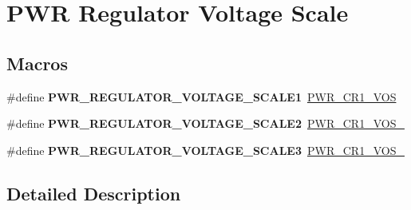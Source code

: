 \hypertarget{group___p_w_r___regulator___voltage___scale}{}\section{P\+WR Regulator Voltage Scale}
\label{group___p_w_r___regulator___voltage___scale}
\subsection*{Macros}
\begin{DoxyCompactItemize}
\item 
\mbox{\label{group___p_w_r___regulator___voltage___scale_ga3b5ca5ab9c19938a14d273825bcf840e}} 
\#define {\bfseries P\+W\+R\+\_\+\+R\+E\+G\+U\+L\+A\+T\+O\+R\+\_\+\+V\+O\+L\+T\+A\+G\+E\+\_\+\+S\+C\+A\+L\+E1}~\mbox{\hyperlink{group___peripheral___registers___bits___definition_gac0de060b7b7fbbb12926c28cf5252c61}{P\+W\+R\+\_\+\+C\+R1\+\_\+\+V\+OS}}
\item 
\mbox{\label{group___p_w_r___regulator___voltage___scale_gaa0d38e304a0adfdbb58a61c96bdb95e9}} 
\#define {\bfseries P\+W\+R\+\_\+\+R\+E\+G\+U\+L\+A\+T\+O\+R\+\_\+\+V\+O\+L\+T\+A\+G\+E\+\_\+\+S\+C\+A\+L\+E2}~\mbox{\hyperlink{group___peripheral___registers___bits___definition_gaacc72946b4e421a4279cd7340f3135db}{P\+W\+R\+\_\+\+C\+R1\+\_\+\+V\+O\+S\+\_}}
\item 
\mbox{\label{group___p_w_r___regulator___voltage___scale_gabed272232ad95f663da2a758834d0ba9}} 
\#define {\bfseries P\+W\+R\+\_\+\+R\+E\+G\+U\+L\+A\+T\+O\+R\+\_\+\+V\+O\+L\+T\+A\+G\+E\+\_\+\+S\+C\+A\+L\+E3}~\mbox{\hyperlink{group___peripheral___registers___bits___definition_ga7e74cd6e5c3d16efc03c27d75a4624cb}{P\+W\+R\+\_\+\+C\+R1\+\_\+\+V\+O\+S\+\_}}
\end{DoxyCompactItemize}


\subsection{Detailed Description}
